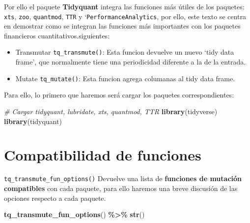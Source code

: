 \documentclass[
]{book}
\newenvironment{Shaded}{\begin{snugshade}}{\end{snugshade}}
\newcommand{\CommentTok}[1]{\textcolor[rgb]{0.56,0.35,0.01}{\textit{#1}}}
\newcommand{\FunctionTok}[1]{\textcolor[rgb]{0.13,0.29,0.53}{\textbf{#1}}}
\newcommand{\NormalTok}[1]{#1}
\newcommand{\SpecialCharTok}[1]{\textcolor[rgb]{0.81,0.36,0.00}{\textbf{#1}}}
\begin{document}
Por ello el paquete \textbf{Tidyquant} integra las funciones más útiles de los paquetes: \texttt{xts}, \texttt{zoo}, \texttt{quantmod}, \texttt{TTR} y `\texttt{PerformanceAnalytics}, por ello, este texto se centra en demostrar como se integran las funciones más importantes con los paquetes financieros cuantitativos.siguientes:

\begin{itemize}
\item
  Transmutar \texttt{tq\_transmute()}: Esta funcion devuelve un nuevo `tidy data frame', que normalmente tiene una periodicidad diferente a la de la entrada.
\item
  Mutate \texttt{tq\_mutate()}: Esta funcion agrega columanas al tidy data frame.
\end{itemize}

Para ello, lo primero que haremos será cargar los paquetes correspondientes:

\begin{Shaded}
\begin{Highlighting}[]
\CommentTok{\# Cargar tidyquant, lubridate, xts, quantmod, TTR }
\FunctionTok{library}\NormalTok{(tidyverse)}
\FunctionTok{library}\NormalTok{(tidyquant)}
\end{Highlighting}
\end{Shaded}

\hypertarget{compatibilidad-de-funciones}{%
\section{Compatibilidad de funciones}\label{compatibilidad-de-funciones}}

\texttt{tq\_transmute\_fun\_options()} Devuelve una lista de \textbf{funciones de mutación compatibles} con cada paquete, para ello haremos una breve discusión de las opciones respecto a cada paquete.

\begin{Shaded}
\begin{Highlighting}[]
\FunctionTok{tq\_transmute\_fun\_options}\NormalTok{() }\SpecialCharTok{\%\textgreater{}\%} \FunctionTok{str}\NormalTok{()}
\end{Highlighting}
\end{Shaded}

\begin{Shaded}
\end{Shaded}
\end{document}

